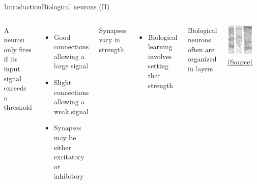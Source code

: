 \documentclass[10pt,compress]{beamer} %
\begin{document}
\begin{frame}{Introduction}{Biological neurons (II)}
	\begin{columns}[c]
		A neuron only fires if its input signal exceeds a threshold
		\begin{itemize}
		\item Good connections allowing a large signal
		\item Slight connections allowing a weak signal
		\item Synapses may be either excitatory or inhibitory
		\end{itemize}

		Synapses vary in strength
		\begin{itemize}
		\item Biological learning involves setting that strength
		\end{itemize}
		Biological neurons often are organized in layers

		\includegraphics[width=\linewidth]{figs/cortex.png}
	        \centering \tiny{\href{https://en.wikipedia.org/wiki/Cerebral_cortex}{(Source)}}
    \end{columns}
\end{frame}
\end{document}
